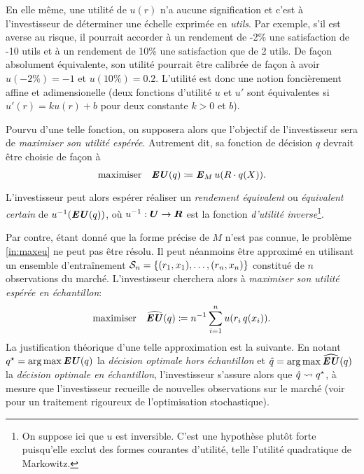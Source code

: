 En elle même, une utilité de $u(r)$ n'a aucune signification et c'est à l'investisseur de
déterminer une échelle exprimée en \textit{utils}. Par exemple, s'il est averse au risque,
il pourrait accorder à un rendement de -2\% une satisfaction de -10 utils et à un
rendement de 10\% une satisfaction que de 2 utils. De façon absolument équivalente, son
utilité pourrait être calibrée de façon à avoir $u(-2\%) = -1$ et $u(10\%) =
0.2$. L'utilité est donc une notion foncièrement affine et adimensionelle (deux fonctions
d'utilité $u$ et $u'$ sont équivalentes si $u'(r) = ku(r) + b$ pour deux constante $k>0$
et $b$).

Pourvu d'une telle fonction, on supposera alors que l'objectif de l'investisseur sera de
\textit{maximiser son utilité espérée}. Autrement dit, sa fonction de décision $q$ devrait
être choisie de façon à
\begin{equation}
  \label{in:maxeu}
  \maximizeEquation{\EU(q) \coloneq \E_M u(R\cdot q(X)).}
\end{equation}
L'investisseur peut alors espérer réaliser un \textit{rendement équivalent} ou
\textit{équivalent certain} de $u^{-1}(\EU(q))$, où $u^{-1}:\Ut \to \R$ est la fonction
\textit{d'utilité inverse}\footnote{On suppose ici que $u$ est inversible. C'est une
  hypothèse plutôt forte puisqu'elle exclut des formes courantes d'utilité, telle
  l'utilité quadratique de Markowitz.}.

Par contre, étant donné que la forme précise de $M$ n'est pas connue, le problème
\eqref{in:maxeu} ne peut pas être résolu. Il peut néanmoins être approximé en utilisant un
ensemble d'entraînement $\S_n = \{(r_1,x_1),\ldots,(r_n,x_n)\}$ constitué de $n$
observations du marché. L'investisseur cherchera alors à \textit{maximiser son utilité
  espérée en échantillon}:
\begin{equation}
  \maximizeEquation{\hEU(q) \coloneqq n^{-1} \sumi u(r_i\,q(x_i)).}
\end{equation}
La justification théorique d'une telle approximation est la suivante. En notant
$q^\star = \argmax\EU(q)$ la \textit{décision optimale hors échantillon} et
$\qh = \argmax\hEU(q)$ la \textit{décision optimale en échantillon}, l'investisseur
s'assure alors que $\qh \leadsto q^\star$, à mesure que l'investisseur recueille de nouvelles
observations sur le marché (voir \cite{shapiro2009lectures} pour un traitement rigoureux
de l'optimisation stochastique).


